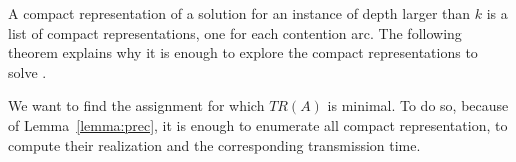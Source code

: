 \documentclass[english]{article}
\begin{document}
A compact representation of a solution for an instance of depth larger than $k$
is a list of compact representations, one for each contention arc. The following theorem explains why it is enough to explore the compact representations to solve \spall.



We want to find the assignment for which $TR(A)$ is minimal. To do so, because of Lemma~\ref{lemma:prec}, it is enough to 
enumerate all compact representation, to compute their realization and the corresponding transmission time.


\end{document}
